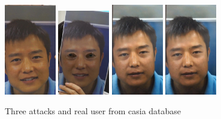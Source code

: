 \begin{figure}[htb]
\centering
\includegraphics[width=0.2\textwidth]{images_databases/casia/at1-2.jpg}
\includegraphics[width=0.2\textwidth]{images_databases/casia/at2-2.jpg}
\includegraphics[width=0.2\textwidth]{images_databases/casia/at3-2.jpg}
\includegraphics[width=0.2\textwidth]{images_databases/casia/real2.jpg}

\caption{Three attacks and real user from casia database } \label{fig:casia2}
\end{figure}

